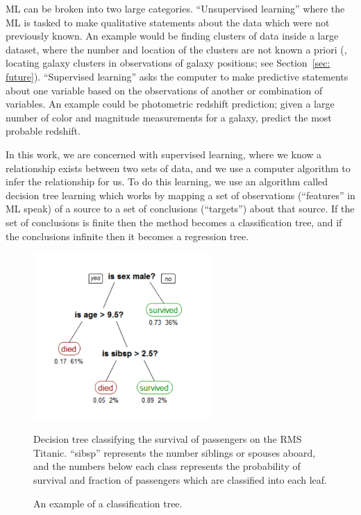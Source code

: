 ML can be broken into two large categories. ``Unsupervised learning'' where the ML is tasked to make qualitative statements about the data which were not previously known. An example would be finding clusters of data inside a large dataset, where the number and location of the clusters are not known a priori (\eg, locating galaxy clusters in observations of galaxy positions; see Section~\ref{sec: future}). ``Supervised learning'' asks the computer to make predictive statements about one variable based on the observations of another or combination of variables. An example could be photometric redshift prediction; given a large number of color and magnitude measurements for a galaxy, predict the most probable redshift.  

In this work, we are concerned with supervised learning, where we know a relationship exists between two sets of data, and we use a computer algorithm to infer the relationship for us. To do this learning, we use an algorithm called decision tree learning which works by mapping a set of observations (``features'' in ML speak) of a source to a set of conclusions (``targets'') about that source. If the set of conclusions is finite then the method becomes a classification tree, and if the conclusions infinite then it becomes a regression tree. 

\begin{figure}[ht]
	\begin{center}
		\includegraphics[width=0.6\textwidth]{figures/CART_tree_titanic_survivors.pdf} 
	\end{center}
	\caption{An example of a classification tree.}
	Decision tree classifying the survival of passengers on the RMS Titanic. ``sibsp'' represents the number siblings or spouses aboard, and the numbers below each class represents the probability of survival and fraction of passengers which are classified into each leaf. 
	\label{fig: cart tree} 
\end{figure}

